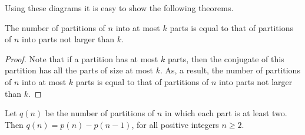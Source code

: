 Using these diagrams it is easy to show the following theorems.
\begin{theorem}
  The number of partitions of $n$ into at most $k$ parts is equal to that of
  partitions of $n$ into parts not larger than $k$.
\end{theorem}
\begin{proof}
  Note that if a partition has at most $k$ parts, then the conjugate of this
  partition has all the parts of size at most $k$. As, a result, the number
  of partitions of $n$ into at most $k$ parts is equal to that of
  partitions of $n$ into parts not larger than $k$.
\end{proof}

\begin{chapterendexercises}
  \exercise
  Let $q(n)$ be the number of partitions of $n$ in which each part is at least
  two. Then $q(n) = p(n) - p(n - 1)$, for all positive integers $n \ge 2$.
\end{chapterendexercises}
